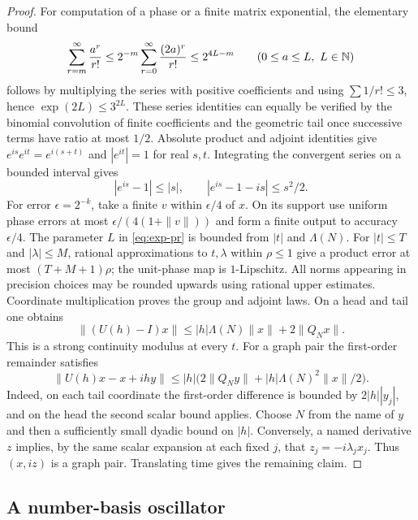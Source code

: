 \begin{proof}
For computation of a phase or a finite matrix exponential, the elementary
bound
\begin{equation}\label{eq:exp-pr}
 \sum_{r=m}^\infty {a^r\over r!}
 \le 2^{-m}\sum_{r=0}^\infty{(2a)^r\over r!}
 \le 2^{4L-m}\qquad(0\le a\le L,\ L\in\mathbb N)
\end{equation}
follows by multiplying the series with positive coefficients and using
$\sum 1/r!\le3$, hence $\exp(2L)\le3^{2L}$. These series identities can
equally be verified by the binomial convolution of finite coefficients
and the geometric tail once successive terms have ratio at most $1/2$.
Absolute product and adjoint identities give
$e^{is}e^{it}=e^{i(s+t)}$ and $|e^{it}|=1$ for real $s,t$.
Integrating the convergent series on a bounded interval gives
\[
 |e^{is}-1|\le |s|,\qquad |e^{is}-1-is|\le s^2/2 .
\]
For error $\epsilon=2^{-k}$, take a finite $v$ within $\epsilon/4$ of
$x$. On its support use uniform phase errors at most
$\epsilon/(4(1+\|v\|))$ and form a finite output to accuracy
$\epsilon/4$. The parameter $L$ in \eqref{eq:exp-pr} is bounded from
$|t|$ and $\Lambda(N)$. For
$|t|\le T$ and $|\lambda|\le M$, rational approximations to $t,\lambda$
within $\rho\le1$ give a product error at most $(T+M+1)\rho$;
the unit-phase map is $1$-Lipschitz. All norms appearing in precision choices may be
rounded upwards using rational upper estimates. Coordinate multiplication
proves the group and adjoint laws. On a head and tail one obtains
\[
 \|(U(h)-I)x\|\le |h|\Lambda(N)\|x\|+2\|Q_Nx\|.
\]
This is a strong continuity modulus at every $t$. For a graph pair the
first-order remainder satisfies
\[
 \|U(h)x-x+ihy\|
 \le |h|\bigl(2\|Q_Ny\|+|h|\Lambda(N)^2\|x\|/2\bigr).
\]
Indeed, on each tail coordinate the first-order difference is bounded
by $2|h||y_j|$, and on the head the second scalar bound applies.
Choose $N$ from the name of $y$ and then a sufficiently small dyadic
bound on $|h|$. Conversely, a named derivative $z$ implies, by the same
scalar expansion at each fixed $j$, that $z_j=-i\lambda_jx_j$.
Thus $(x,iz)$ is a graph pair. Translating time gives the remaining
claim.
\end{proof}

\subsection{A number-basis oscillator}

